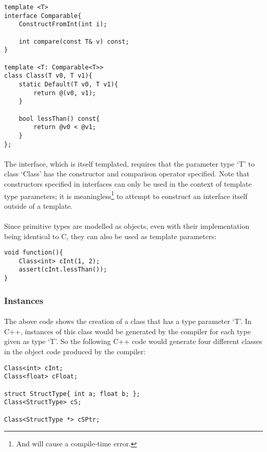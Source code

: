 \documentclass[12pt,twoside,notitlepage]{report}
\begin{document}
\begin{lstlisting}
template <T>
interface Comparable{
	ConstructFromInt(int i);

	int compare(const T& v) const;
}

template <T: Comparable<T>>
class Class(T v0, T v1){
	static Default(T v0, T v1){
		return @(v0, v1);
	}

	bool lessThan() const{
		return @v0 < @v1;
	}
};
\end{lstlisting}


\paragraph{}
The interface, which is itself templated, requires that the parameter type `T' to class `Class' has the constructor and comparison operator specified. Note that constructors specified in interfaces can only be used in the context of template type parameters; it is meaningless\footnote{And will cause a compile-time error.} to attempt to construct an interface itself outside of a template.

\paragraph{}
Since primitive types are modelled as objects, even with their implementation being identical to C, they can also be used as template parameters:


\begin{lstlisting}
void function(){
	Class<int> cInt(1, 2);
	assert(cInt.lessThan());
}
\end{lstlisting}


\subsubsection{Instances}

\paragraph{}
The above code shows the creation of a class that has a type parameter `T'. In C++, instances of this class would be generated by the compiler for each type given as type `T'. So the following C++ code would generate four different classes in the object code produced by the compiler:


\begin{lstlisting}
Class<int> cInt;
Class<float> cFloat;

struct StructType{ int a; float b; };
Class<StructType> cS;

Class<StructType *> cSPtr;
\end{lstlisting}
\end{document}
